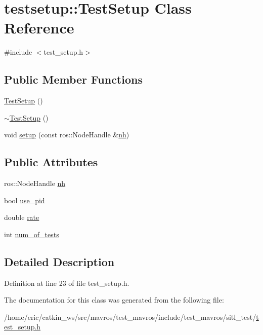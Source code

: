 \hypertarget{classtestsetup_1_1TestSetup}{}\section{testsetup\+::Test\+Setup Class Reference}
\label{classtestsetup_1_1TestSetup}


{\ttfamily \#include $<$test\+\_\+setup.\+h$>$}

\subsection*{Public Member Functions}
\begin{DoxyCompactItemize}
\item 
\mbox{\hyperlink{group__sitl__test_gaa1e6e5d6eda73c0fd35932f562fc9537}{Test\+Setup}} ()
\item 
\mbox{\hyperlink{group__sitl__test_ga172d41e243ecb1ce863fdb203acc8070}{$\sim$\+Test\+Setup}} ()
\item 
void \mbox{\hyperlink{group__sitl__test_ga8d8d5e70f33e67398c343a4804ee1a89}{setup}} (const ros\+::\+Node\+Handle \&\mbox{\hyperlink{group__sitl__test_gab33b5c9c5ebfe96b53fd53b93ba4ae0e}{nh}})
\end{DoxyCompactItemize}
\subsection*{Public Attributes}
\begin{DoxyCompactItemize}
\item 
ros\+::\+Node\+Handle \mbox{\hyperlink{group__sitl__test_gab33b5c9c5ebfe96b53fd53b93ba4ae0e}{nh}}
\item 
bool \mbox{\hyperlink{group__sitl__test_ga3c95d693bf1b2c713c6d8d6f8a5c73b3}{use\+\_\+pid}}
\item 
double \mbox{\hyperlink{group__sitl__test_ga912ce4eeed9553edb6bf2e636685a3a8}{rate}}
\item 
int \mbox{\hyperlink{group__sitl__test_ga53ac99edc3a6966ca9233341c7d58dee}{num\+\_\+of\+\_\+tests}}
\end{DoxyCompactItemize}


\subsection{Detailed Description}


Definition at line 23 of file test\+\_\+setup.\+h.



The documentation for this class was generated from the following file\+:\begin{DoxyCompactItemize}
\item 
/home/eric/catkin\+\_\+ws/src/mavros/test\+\_\+mavros/include/test\+\_\+mavros/sitl\+\_\+test/\mbox{\hyperlink{test__setup_8h}{test\+\_\+setup.\+h}}\end{DoxyCompactItemize}
